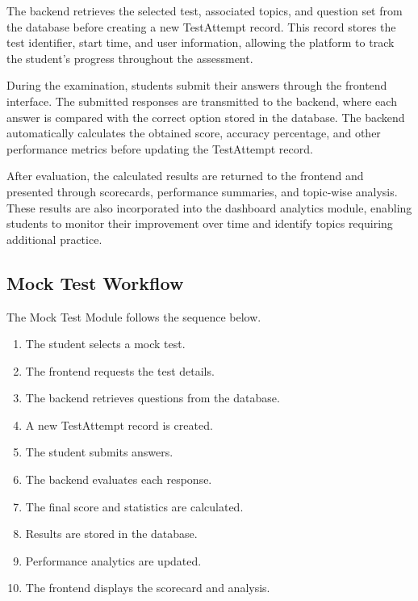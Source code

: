 The backend retrieves the selected test, associated topics, and question set from the database before creating a new TestAttempt record. This record stores the test identifier, start time, and user information, allowing the platform to track the student's progress throughout the assessment.

During the examination, students submit their answers through the frontend interface. The submitted responses are transmitted to the backend, where each answer is compared with the correct option stored in the database. The backend automatically calculates the obtained score, accuracy percentage, and other performance metrics before updating the TestAttempt record.

After evaluation, the calculated results are returned to the frontend and presented through scorecards, performance summaries, and topic-wise analysis. These results are also incorporated into the dashboard analytics module, enabling students to monitor their improvement over time and identify topics requiring additional practice.

\subsection{Mock Test Workflow}

The Mock Test Module follows the sequence below.

\begin{enumerate}

\item The student selects a mock test.

\item The frontend requests the test details.

\item The backend retrieves questions from the database.

\item A new TestAttempt record is created.

\item The student submits answers.

\item The backend evaluates each response.

\item The final score and statistics are calculated.

\item Results are stored in the database.

\item Performance analytics are updated.

\item The frontend displays the scorecard and analysis.

\end{enumerate}

